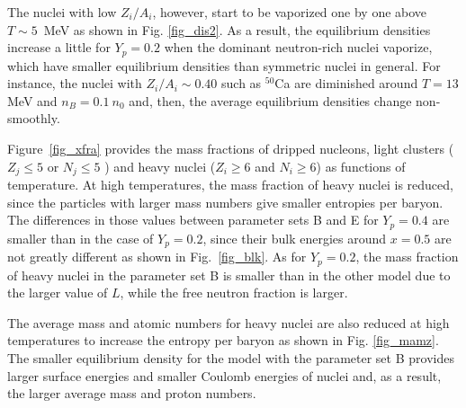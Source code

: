 \documentclass[preprint]{revtex4}
\begin{document}
{%
The nuclei with low $Z_i/A_i$, however, start to be vaporized one by one above $T \sim 5$~MeV as shown in Fig. \ref{fig_dis2}. 
As a result, the equilibrium densities increase a little  
for $Y_p=0.2$ when the dominant neutron-rich nuclei  vaporize, 
which have smaller equilibrium densities than symmetric nuclei 
 in general.
For instance, the nuclei with $Z_i/A_i \sim0.40$ such as  $^{50}$Ca are diminished around $T=13$ MeV and $n_B=0.1 \ n_0$  
and, then, the average equilibrium densities change non-smoothly.

Figure~\ref{fig_xfra} provides the mass fractions of dripped nucleons, light clusters ($Z_j \leq 5$ or $N_j \leq 5$ ) and heavy nuclei ($Z_i \geq 6$ and $N_i \geq 6$)  as functions of temperature. 
At high temperatures, the mass fraction of heavy nuclei is reduced,
 since the particles with larger mass numbers give smaller entropies per baryon. 
The differences in those values between parameter sets B and E for $Y_p=0.4$ are smaller than in the case of $Y_p=0.2$, 
since their bulk energies around $x = 0.5$  are not greatly different as shown in Fig.~\ref{fig_blk}.
As for $Y_p=0.2$, the mass fraction of heavy nuclei  in the parameter set B
 is smaller than in the other model
due to the larger value of $L$, while the free neutron fraction is larger.
{%
The average mass and atomic numbers for heavy nuclei  are also reduced at high temperatures to increase the entropy per baryon as shown in Fig. \ref{fig_mamz}.
The smaller equilibrium density for the model with the parameter set B provides larger surface energies and smaller Coulomb energies of nuclei and, as a result,
 the larger  average  mass and proton numbers. 


}}
\end{document}
